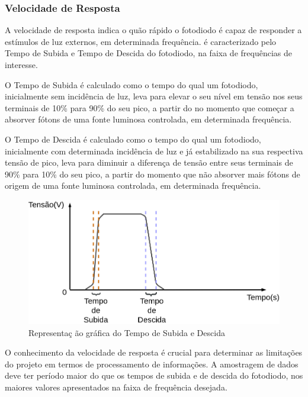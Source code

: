 \subsubsection{Velocidade de Resposta}
A velocidade de resposta indica o quão rápido o fotodiodo \'e capaz de responder a estímulos de luz externos, em determinada frequência. \'e caracterizado pelo Tempo de Subida e Tempo de Descida do fotodiodo, na faixa de frequências de interesse.

O Tempo de Subida \'e calculado como o tempo do qual um fotodiodo, inicialmente sem incidência de luz, leva para elevar o seu nível em tensão nos seus terminais de 10\% para 90\% do seu pico, a partir do no momento que começar a absorver fótons de uma fonte luminosa controlada, em determinada frequência.

O Tempo de Descida \'e calculado como o tempo do qual um fotodiodo, inicialmente com determinada incidência de luz e já estabilizado na sua respectiva tensão de pico, leva para diminuir a diferença de tensão entre seus terminais de 90\% para 10\% do seu pico, a partir do momento que não absorver mais fótons de origem de uma fonte luminosa controlada, em determinada frequência.

\begin{figure}[htb]
	\caption{\label{fig_velocidadeResp}Representa{\c c} \~ao gr\'afica do Tempo de Subida e Descida}
	\begin{center}
	    \includegraphics[scale=0.3]{Imagens/GraficoVelocidadeResposta.png}
	\end{center}
\end{figure}

O conhecimento da velocidade de resposta \'e crucial para determinar as limitações do projeto em termos de processamento de informações. A amostragem de dados deve ter período maior do que os tempos de subida e de descida do fotodiodo, nos maiores valores apresentados na faixa de frequência desejada.

